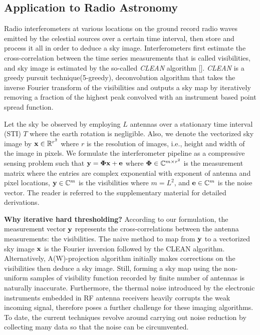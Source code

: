 \documentclass{article}
\begin{document}
\subsection{Application to Radio Astronomy}
Radio interferometers at various locations on the ground record radio waves emitted by the celestial sources over a certain time interval, then store and process it all in order to deduce a sky image. Interferometers first estimate the cross-correlation between the time series measurements that is called visibilities, and sky image is estimated by the so-called {\it CLEAN} algorithm []. {\it CLEAN} is a greedy pursuit technique(5-greedy), deconvolution algorithm that takes the inverse Fourier transform of the visibilities and outputs a sky map by iteratively removing a fraction of the highest peak convolved with an instrument based point spread function.

Let the sky be observed by employing $L$ antennas over a stationary time interval (STI) $T$ where the earth rotation is negligible. Also, we denote the vectorized sky image by ${\bf x} \in \mathbb{R}^{r^2}$ where $r$ is the resolution of images, i.e., height and width of the image in pixels. We formulate the interferometer pipeline as a compressive sensing problem such that ${\bf y} = {\bf \Phi} {\bf x} + {\bf e}$ where ${\bf \Phi} \in \mathbb{C}^{m\times r^2}$ is the measurement matrix where the entries are complex exponential with exponent of antenna and pixel locations, ${\bf y} \in \mathbb{C}^{m}$ is the visibilities where $m=L^2$, and ${\bf e} \in \mathbb{C}^m$ is the noise vector. The reader is referred to the supplementary material for detailed derivations. 


{\bf Why iterative hard thresholding?} According to our formulation, the measurement vector ${\bf y}$ represents the cross-correlations between the antenna measurements: the visibilities. The naive method to map from ${\bf y}$ to a vectorized sky image ${\bf x}$ is the Fourier inversion followed by the CLEAN algorithm. Alternatively, A(W)-projection algorithm initially makes corrections on the visibilities then deduce a sky image. Still, forming a sky map using the non-uniform samples of visibility function recorded by finite number of antennas is naturally inaccurate. Furthermore, the thermal noise introduced by the electronic instruments embedded in RF antenna receivers heavily corrupts the weak incoming signal, therefore poses a further challenge for these imaging algorithms. To date, the current techniques revolve around carrying out noise reduction by collecting many data so that the noise can be circumvented.
\end{document}
